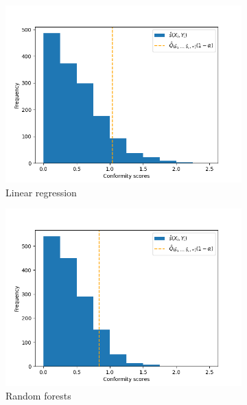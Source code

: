 \documentclass[11pt, titlepage]{article} %
\numberwithin{equation}{section}
\theoremstyle{definition}
\numberwithin{theorem}{section}
\numberwithin{lemma}{section}
\numberwithin{corollary}{section}
\numberwithin{proposition}{section}
\numberwithin{definition}{section}
\numberwithin{remark}{section}
\begin{document}
\begin{figure}[H]
\begin{subfigure}{0.49\textwidth}
        \includegraphics[width=\linewidth]{figures/2_3_LR_scores.png}    
        \caption{Linear regression} \label{fig:2_3_LR_scores}
    \end{subfigure}
    \begin{subfigure}{0.49\textwidth}
        \includegraphics[width=\linewidth]{figures/2_3_RF_scores.png}    
        \caption{Random forests} \label{fig:2_3_RF_scores}
    \end{subfigure}
    \begin{subfigure}{0.49\textwidth}

\end{subfigure}
\end{figure}
\end{document}
